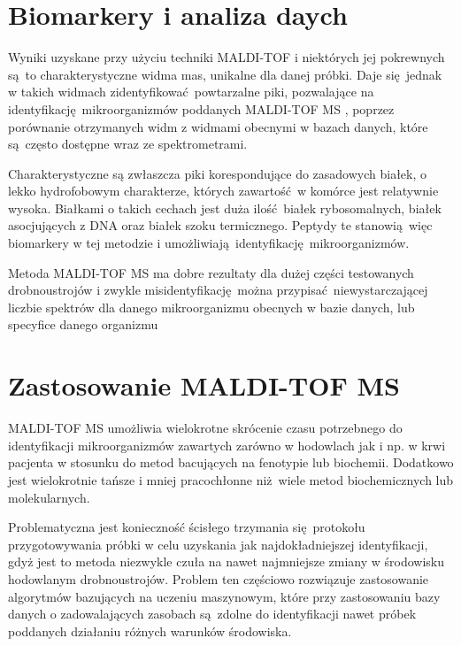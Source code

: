 \documentclass[two column, twoside, a4paper]{article}
\newcommand{\maldi}{MALDI-TOF MS }
\begin{document}
\section{Biomarkery i analiza daych}

Wyniki uzyskane przy użyciu techniki MALDI-TOF i niektórych jej pokrewnych są to charakterystyczne widma mas, unikalne dla danej próbki. Daje się jednak w takich widmach zidentyfikować powtarzalne piki, pozwalające na identyfikację mikroorganizmów poddanych \maldi, poprzez porównanie otrzymanych widm z widmami obecnymi w bazach danych, które są często dostępne wraz ze spektrometrami.

Charakterystyczne są zwłaszcza piki korespondujące do zasadowych białek, o lekko hydrofobowym charakterze, których zawartość w komórce jest relatywnie wysoka. Białkami o takich cechach jest duża ilość białek rybosomalnych, białek asocjujących z DNA oraz białek szoku termicznego. Peptydy te stanowią więc biomarkery w tej metodzie i umożliwiają identyfikację mikroorganizmów.

Metoda \maldi ma dobre rezultaty dla dużej części testowanych drobnoustrojów i zwykle misidentyfikację można przypisać niewystarczającej liczbie spektrów dla danego mikroorganizmu obecnych w bazie danych, lub specyfice danego organizmu\autocite{Croxatto2012}

\section{Zastosowanie MALDI-TOF MS}

\maldi umożliwia wielokrotne skrócenie czasu potrzebnego do identyfikacji mikroorganizmów zawartych zarówno w hodowlach jak i np. w krwi pacjenta w stosunku do metod bacujących na fenotypie lub biochemii. Dodatkowo jest wielokrotnie tańsze i mniej pracochłonne niż wiele metod biochemicznych lub molekularnych.

Problematyczna jest konieczność ścisłego trzymania się protokołu przygotowywania próbki w celu uzyskania jak najdokładniejszej identyfikacji, gdyż jest to metoda niezwykle czuła na nawet najmniejsze zmiany w środowisku hodowlanym drobnoustrojów. Problem ten częściowo rozwiązuje zastosowanie algorytmów bazujących na uczeniu maszynowym, które przy zastosowaniu bazy danych o zadowalających zasobach są zdolne do identyfikacji nawet próbek poddanych działaniu różnych warunków środowiska\autocite{Croxatto2012}.
\end{document}
